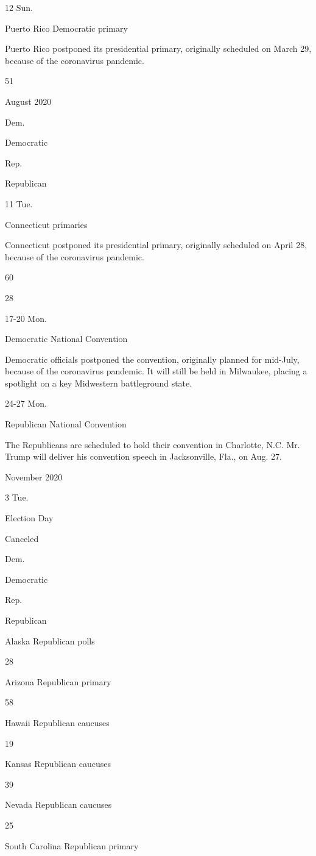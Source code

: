 12 Sun.

Puerto Rico Democratic primary

Puerto Rico postponed its presidential primary, originally scheduled on
March 29, because of the coronavirus pandemic.

51

August 2020

Dem.

Democratic

Rep.

Republican

11 Tue.

Connecticut primaries

Connecticut postponed its presidential primary, originally scheduled on
April 28, because of the coronavirus pandemic.

60

28

17-20 Mon.

Democratic National Convention

Democratic officials postponed the convention, originally planned for
mid-July, because of the coronavirus pandemic. It will still be held in
Milwaukee, placing a spotlight on a key Midwestern battleground state.

24-27 Mon.

Republican National Convention

The Republicans are scheduled to hold their convention in Charlotte,
N.C. Mr. Trump will deliver his convention speech in Jacksonville, Fla.,
on Aug. 27.

November 2020

3 Tue.

Election Day

Canceled

Dem.

Democratic

Rep.

Republican

Alaska Republican polls

28

Arizona Republican primary

58

Hawaii Republican caucuses

19

Kansas Republican caucuses

39

Nevada Republican caucuses

25

South Carolina Republican primary

